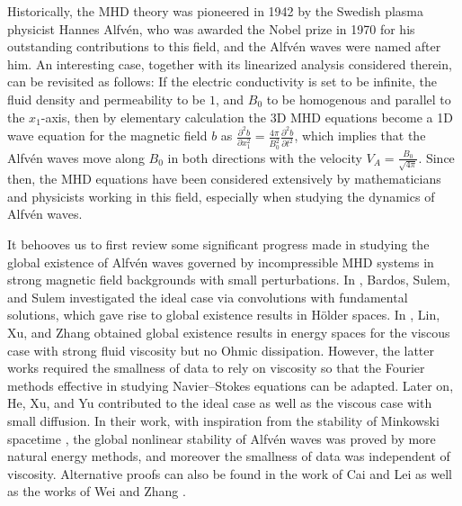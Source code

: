 \documentclass[10pt,reqno]{amsart}
\numberwithin{equation}{section}
\begin{document}
Historically, the MHD theory was pioneered in 1942 \cite{Alfven} by  the Swedish plasma physicist Hannes Alfv\'en, who was awarded the Nobel prize in 1970 for his outstanding contributions to this field, and the Alfv\'en waves were named after him.  
An interesting case, together with its linearized analysis considered  therein, can be revisited as follows: 
If the electric conductivity is set to be infinite, the fluid density and permeability to be $1$, and $B_0$ to be homogenous and parallel to the $x_1$-axis, then 
by elementary calculation the 3D MHD equations become a 
1D wave equation for the magnetic field $b$ as 
$\frac{\partial^2 b}{\partial x_1^2}=\frac{4\pi}{B_0^2}\frac{\partial^2 b}{\partial t^2}$, which implies that the Alfv\'en waves move along $B_0$ in both directions with the velocity $V_A=\frac{B_0}{\sqrt{4\pi}}$. 
Since then, the MHD equations have been considered extensively by mathematicians and physicists working in this field, especially when studying the dynamics of Alfv\'en waves. 

It behooves us to first review some significant  progress  
made in studying the global existence 
of Alfv\'en waves governed by  incompressible MHD systems  in strong magnetic field backgrounds with small perturbations. In \cite{Bardos-Sulem-Sulem}, Bardos, Sulem, and Sulem  
investigated  the ideal case via convolutions with fundamental solutions, which gave rise to global existence results 
 in H\"older spaces. 
In \cite{Lin-Zhang, Xu-Zhang}, Lin, Xu, and Zhang   obtained global existence results
 in energy spaces for the viscous case with strong fluid viscosity 
but no Ohmic dissipation. However, the latter works required the smallness of 
data to rely on viscosity so that the Fourier methods effective in 
studying Navier--Stokes equations can be adapted. Later on, He, Xu, and Yu \cite{He-Xu-Yu} contributed  to the ideal case  as well as the viscous case with small diffusion. In their work, with inspiration from the stability of Minkowski spacetime \cite{Christodoulou-Klainerman}, 
the global nonlinear stability of Alfv\'en waves was proved by more natural energy methods, and moreover the smallness of data was independent of viscosity.
 Alternative proofs can also be found in 
 the work of Cai and Lei \cite{Cai-Lei} as well as  the works of Wei and 
 Zhang  \cite{Wei-Zhang-2017,Wei-Zhang-2018}.  
 
\end{document}

